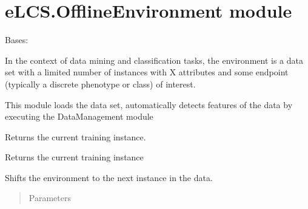 \documentclass[letterpaper,10pt,english]{sphinxmanual}
\begin{document}
\section{eLCS.OfflineEnvironment module}
\label{\detokenize{eLCS:elcs-offlineenvironment-module}}\label{\detokenize{eLCS:module-eLCS.OfflineEnvironment}}

\begin{fulllineitems}
\label{\detokenize{eLCS:eLCS.OfflineEnvironment.OfflineEnvironment}}
Bases: 

In the context of data mining and classification tasks,
the environment is a data set with a limited number of instances with X attributes
and some endpoint (typically a discrete phenotype or class) of interest.

This module loads the data set, automatically detects features of the data by executing
the DataManagement module

\begin{fulllineitems}
\label{\detokenize{eLCS:eLCS.OfflineEnvironment.OfflineEnvironment.getTestInstance}}
Returns the current training instance.

\end{fulllineitems}


\begin{fulllineitems}
\label{\detokenize{eLCS:eLCS.OfflineEnvironment.OfflineEnvironment.getTrainInstance}}
Returns the current training instance

\end{fulllineitems}


\begin{fulllineitems}
\label{\detokenize{eLCS:eLCS.OfflineEnvironment.OfflineEnvironment.newInstance}}
Shifts the environment to the next instance in the data.
\begin{quote}\begin{description}
\item[{Parameters}] \leavevmode
{} \textendash{} 


\end{description}
\end{quote}
\end{fulllineitems}
\end{fulllineitems}
\end{document}

